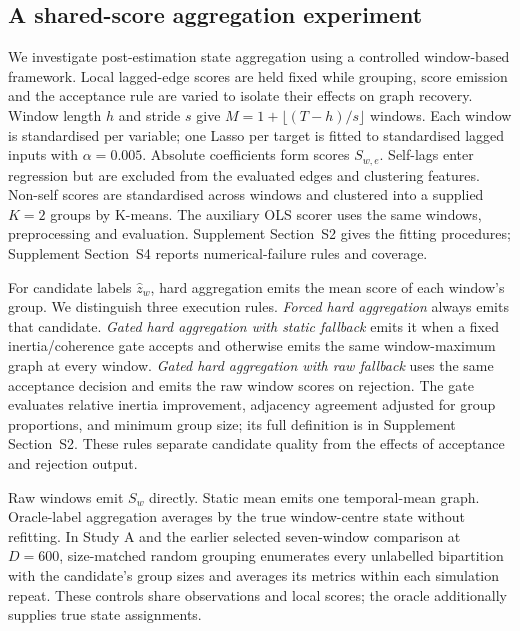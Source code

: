\documentclass[11pt]{article}
\begin{document}
\subsection{A shared-score aggregation experiment}
\label{sec:method}
We investigate post-estimation state aggregation using a controlled window-based
framework. Local lagged-edge scores are held fixed while grouping, score
emission and the acceptance rule are varied to isolate their effects on graph
recovery. Window length $h$ and stride $s$ give
$M=1+\lfloor(T-h)/s\rfloor$ windows. Each window is standardised per variable;
one Lasso per target is fitted to standardised lagged inputs with
$\alpha=0.005$. Absolute coefficients form scores $S_{w,e}$. Self-lags enter
regression but are excluded from the evaluated edges and clustering features.
Non-self scores are standardised across windows and clustered into a supplied
$K=2$ groups by K-means. The auxiliary OLS scorer uses the same windows,
preprocessing and evaluation. Supplement Section~S2 gives the fitting
procedures; Supplement Section~S4 reports numerical-failure rules and coverage.

For candidate labels $\widehat z_w$, hard aggregation emits the mean score of
each window's group. We distinguish three execution rules. \emph{Forced hard
aggregation} always emits that candidate. \emph{Gated hard aggregation with
static fallback} emits it when a fixed inertia/coherence gate accepts and
otherwise emits the same window-maximum graph at every window.
\emph{Gated hard aggregation with raw fallback} uses the same acceptance
decision and emits the raw window scores on rejection. The gate evaluates
relative inertia improvement, adjacency agreement adjusted for group
proportions, and minimum group size; its full definition is in Supplement
Section~S2. These rules separate candidate quality from the effects of
acceptance and rejection output.

Raw windows emit $S_w$ directly. Static mean emits one temporal-mean graph.
Oracle-label aggregation averages by the true window-centre state without
refitting. In Study A and the earlier selected seven-window comparison at $D=600$,
size-matched random grouping enumerates every unlabelled bipartition with the
candidate's group sizes and averages its metrics within each simulation
repeat. These controls share observations and local scores;
the oracle additionally supplies true state assignments.
\end{document}
